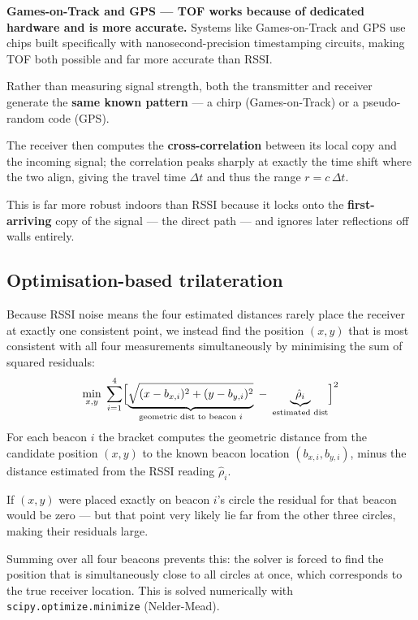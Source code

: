 \documentclass[12pt, a4paper]{article}
\begin{document}
\begin{notebox}
  \textbf{Games-on-Track and GPS --- TOF works because of dedicated hardware
  and is more accurate.}
  Systems like Games-on-Track and GPS use chips built specifically with
  nanosecond-precision timestamping circuits, making TOF both possible
  and far more accurate than RSSI.

  Rather than measuring signal strength, both the transmitter and receiver
  generate the \textbf{same known pattern} --- a chirp (Games-on-Track)
  or a pseudo-random code (GPS).

  The receiver then computes the \textbf{cross-correlation} between its
  local copy and the incoming signal; the correlation peaks sharply at
  exactly the time shift where the two align, giving the travel time
  $\Delta t$ and thus the range $r = c\,\Delta t$.

  This is far more robust indoors than RSSI because it locks onto the
  \textbf{first-arriving} copy of the signal --- the direct path ---
  and ignores later reflections off walls entirely.
\end{notebox}

\subsection*{Optimisation-based trilateration}
Because RSSI noise means the four estimated distances rarely place
the receiver at exactly one consistent point, we instead find the
position $(x, y)$ that is most consistent with all four measurements
simultaneously by minimising the sum of squared residuals:
\[
  \min_{x,y}\;\sum_{i=1}^{4}
  \Bigl[\underbrace{\sqrt{(x-b_{x,i})^2+(y-b_{y,i})^2}}_{\text{geometric dist to beacon }i}
  \;-\;\underbrace{\hat{\rho}_i}_{\text{estimated dist}}\Bigr]^2
\]
For each beacon $i$ the bracket computes the geometric distance from
the candidate position $(x,y)$ to the known beacon location
$(b_{x,i}, b_{y,i})$, minus the distance estimated from the RSSI
reading $\hat{\rho}_i$.

If $(x,y)$ were placed exactly on beacon $i$'s circle the residual
for that beacon would be zero --- but that point very likely lie far from
the other three circles, making their residuals large.

Summing over all four beacons prevents this: the solver is forced to
find the position that is simultaneously close to all circles at once,
which corresponds to the true receiver location.
This is solved numerically with \texttt{scipy.optimize.minimize}
(Nelder-Mead).
\end{document}
